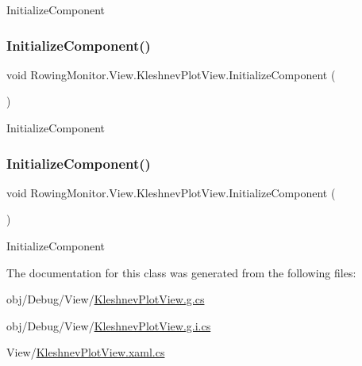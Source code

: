 Initialize\+Component 

\mbox{\label{class_rowing_monitor_1_1_view_1_1_kleshnev_plot_view_a378530c44bc7cb052db6f3a13cfc2db8}} 
\subsubsection{\texorpdfstring{Initialize\+Component()}{InitializeComponent()}\hspace{0.1cm}{\footnotesize\ttfamily [3/4]}}
{\footnotesize\ttfamily void Rowing\+Monitor.\+View.\+Kleshnev\+Plot\+View.\+Initialize\+Component (\begin{DoxyParamCaption}{ }\end{DoxyParamCaption})}



Initialize\+Component 

\mbox{\label{class_rowing_monitor_1_1_view_1_1_kleshnev_plot_view_a378530c44bc7cb052db6f3a13cfc2db8}} 
\subsubsection{\texorpdfstring{Initialize\+Component()}{InitializeComponent()}\hspace{0.1cm}{\footnotesize\ttfamily [4/4]}}
{\footnotesize\ttfamily void Rowing\+Monitor.\+View.\+Kleshnev\+Plot\+View.\+Initialize\+Component (\begin{DoxyParamCaption}{ }\end{DoxyParamCaption})}



Initialize\+Component 



The documentation for this class was generated from the following files\+:\begin{DoxyCompactItemize}
\item 
obj/\+Debug/\+View/\hyperlink{_debug_2_view_2_kleshnev_plot_view_8g_8cs}{Kleshnev\+Plot\+View.\+g.\+cs}\item 
obj/\+Debug/\+View/\hyperlink{_debug_2_view_2_kleshnev_plot_view_8g_8i_8cs}{Kleshnev\+Plot\+View.\+g.\+i.\+cs}\item 
View/\hyperlink{_kleshnev_plot_view_8xaml_8cs}{Kleshnev\+Plot\+View.\+xaml.\+cs}\end{DoxyCompactItemize}
